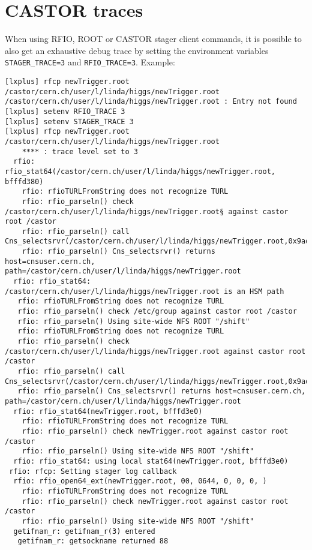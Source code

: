 \section{CASTOR traces}
When using RFIO, ROOT or CASTOR stager client commands, it is possible to also get an exhaustive
debug trace by setting the environment variables {\tt STAGER\_TRACE=3} and {\tt RFIO\_TRACE=3}. Example:
\small
\begin{verbatim}
[lxplus] rfcp newTrigger.root /castor/cern.ch/user/l/linda/higgs/newTrigger.root
/castor/cern.ch/user/l/linda/higgs/newTrigger.root : Entry not found
[lxplus] setenv RFIO_TRACE 3
[lxplus] setenv STAGER_TRACE 3
[lxplus] rfcp newTrigger.root /castor/cern.ch/user/l/linda/higgs/newTrigger.root
    **** : trace level set to 3
  rfio: rfio_stat64(/castor/cern.ch/user/l/linda/higgs/newTrigger.root, bfffd380)
    rfio: rfioTURLFromString does not recognize TURL
    rfio: rfio_parseln() check /castor/cern.ch/user/l/linda/higgs/newTrigger.root§ against castor root /castor
    rfio: rfio_parseln() call Cns_selectsrvr(/castor/cern.ch/user/l/linda/higgs/newTrigger.root,0x9ac4618,0x9ac4200,0xbfff51d8)
    rfio: rfio_parseln() Cns_selectsrvr() returns host=cnsuser.cern.ch, path=/castor/cern.ch/user/l/linda/higgs/newTrigger.root
  rfio: rfio_stat64: /castor/cern.ch/user/l/linda/higgs/newTrigger.root is an HSM path
   rfio: rfioTURLFromString does not recognize TURL
   rfio: rfio_parseln() check /etc/group against castor root /castor
   rfio: rfio_parseln() Using site-wide NFS ROOT "/shift"
   rfio: rfioTURLFromString does not recognize TURL
   rfio: rfio_parseln() check /castor/cern.ch/user/l/linda/higgs/newTrigger.root against castor root /castor
   rfio: rfio_parseln() call Cns_selectsrvr(/castor/cern.ch/user/l/linda/higgs/newTrigger.root,0x9ac4618,0x9ac4200,0xbfff5338)
   rfio: rfio_parseln() Cns_selectsrvr() returns host=cnsuser.cern.ch, path=/castor/cern.ch/user/l/linda/higgs/newTrigger.root
  rfio: rfio_stat64(newTrigger.root, bfffd3e0)
    rfio: rfioTURLFromString does not recognize TURL
    rfio: rfio_parseln() check newTrigger.root against castor root /castor
    rfio: rfio_parseln() Using site-wide NFS ROOT "/shift"
  rfio: rfio_stat64: using local stat64(newTrigger.root, bfffd3e0)
 rfio: rfcp: Setting stager log callback
  rfio: rfio_open64_ext(newTrigger.root, 00, 0644, 0, 0, 0, )
    rfio: rfioTURLFromString does not recognize TURL
    rfio: rfio_parseln() check newTrigger.root against castor root /castor
    rfio: rfio_parseln() Using site-wide NFS ROOT "/shift"
  getifnam_r: getifnam_r(3) entered
   getifnam_r: getsockname returned 88

\end{verbatim}
